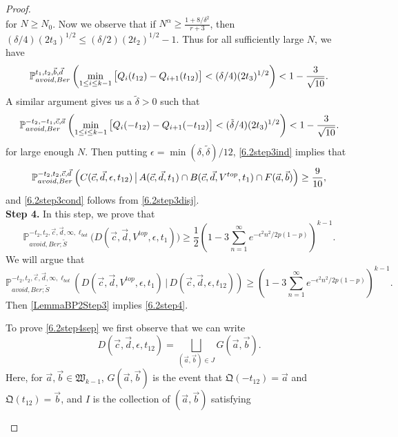 \begin{proof}
\begin{equation}
	\end{equation}
	for $N\geq N_0$. Now we observe that if $N^\alpha \geq \frac{1+8/\delta^2}{r+3}$, then $(\delta/4)(2t_3)^{1/2} \leq (\delta/2)(2t_2)^{1/2} - 1$. Thus for all sufficiently large $N$, we have
	\[
	\mathbb{P}^{t_1,t_2,\vec b, \vec d}_{avoid,Ber}\left(\min_{1\leq i\leq k-1} \big[Q_i(t_{12})-Q_{i+1}(t_{12})\big]<(\delta/4)(2t_3)^{1/2}\right) < 1 - \frac{3}{\sqrt{10}}.
	\]
	A similar argument gives us a $\tilde{\delta}>0$ such that
	\[
	\mathbb{P}^{-t_2,-t_1,\vec c, \vec a}_{avoid,Ber}\left(\min_{1\leq i\leq k-1} \big[Q_i(-t_{12})-Q_{i+1}(-t_{12})\big]<(\tilde\delta/4)(2t_3)^{1/2}\right)<1 - \frac{3}{\sqrt{10}}.
	\]
	for large enough $N$. Then putting $\epsilon = \min(\delta,\tilde{\delta})/12$, \eqref{6.2step3ind} implies that
	\[
	\mathbb{P}^{-t_2,t_2,\vec c, \vec d}_{avoid,Ber}\left(C(\vec{c},\vec{d},\epsilon,t_{12})\,\big|\,A(\vec{c},\vec{d},t_1) \cap B(\vec{c},\vec{d},V^{top},t_1)\cap F(\vec{a},\vec{b})\right) \geq \frac{9}{10},
	\] 
	and \eqref{6.2step3cond} follows from \eqref{6.2step3disj}.\\
	
	{\bf \raggedleft Step 4.} In this step, we prove that
	\begin{equation}\label{6.2step4}
	\mathbb{P}^{-t_2,t_2,\vec{c},\vec{d},\infty,\ell_{bot}}_{avoid,Ber;\tilde S}\big(D(\vec{c},\vec{d},V^{top},\epsilon,t_1) \big) \geq \frac{1}{2}\left(1 - 3\sum_{n=1}^\infty e^{-\epsilon^2 n^2/2p(1-p)}\right)^{k-1}.
	\end{equation}
	We will argue that
	\begin{equation}\label{6.2step4sep}
	\mathbb{P}^{-t_2,t_2,\vec{c},\vec{d},\infty,\ell_{bot}}_{avoid,Ber;\tilde S}\left(D(\vec{c},\vec{d},V^{top},\epsilon,t_1) \,\big|\,D(\vec c, \vec d, \epsilon,t_{12})\right) \geq \left(1 - 3\sum_{n=1}^\infty e^{-\epsilon^2 n^2/2p(1-p)}\right)^{k-1}.
	\end{equation}
	Then \eqref{LemmaBP2Step3} implies \eqref{6.2step4}.
	
	To prove \eqref{6.2step4sep} we first observe that we can write
	\begin{equation}\label{6.2step4disj}
	D(\vec c, \vec d, \epsilon,t_{12}) = \bigsqcup_{(\vec{a},\vec{b})\in J} G(\vec{a},\vec{b}).
	\end{equation}
	Here, for $\vec{a},\vec{b}\in\mathfrak{W}_{k-1}$, $G(\vec{a},\vec{b})$ is the event that $\mathfrak{Q}(-t_{12}) = \vec{a}$ and $\mathfrak{Q}(t_{12}) = \vec{b}$, and $I$ is the collection of $(\vec{a},\vec{b})$ satisfying
	\begin{enumerate}[label = (\arabic*)]
		

\end{enumerate}
\end{proof}
